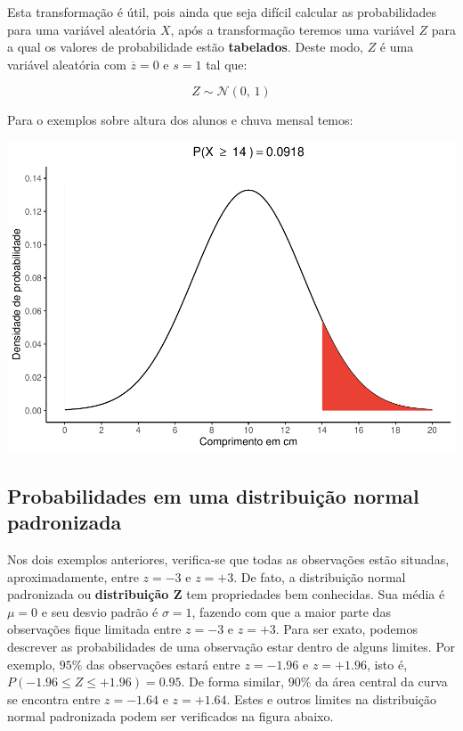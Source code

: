 \documentclass[
]{book}
\begin{document}
Esta transformação é útil, pois ainda que seja difícil calcular as probabilidades para uma variável aleatória \(X\), após a transformação teremos uma variável \(Z\) para a qual os valores de probabilidade estão \textbf{tabelados}. Deste modo, \(Z\) é uma variável aleatória com \(\overline{z} = 0\) e \(s = 1\) tal que:

\[Z \sim \mathcal{N}(0,\,1)\]

Para o exemplos sobre altura dos alunos e chuva mensal temos:

\begin{center}\includegraphics{probest-cambientais_files/figure-latex/unnamed-chunk-77-1} \end{center}

\hypertarget{probabilidades-em-uma-distribuiuxe7uxe3o-normal-padronizada}{%
\subsection{Probabilidades em uma distribuição normal padronizada}\label{probabilidades-em-uma-distribuiuxe7uxe3o-normal-padronizada}}

Nos dois exemplos anteriores, verifica-se que todas as observações estão situadas, aproximadamente, entre \(z = -3\) e \(z = +3\). De fato, a distribuição normal padronizada ou \textbf{distribuição Z} tem propriedades bem conhecidas. Sua média é \(\mu = 0\) e seu desvio padrão é \(\sigma = 1\), fazendo com que a maior parte das observações fique limitada entre \(z = -3\) e \(z = +3\). Para ser exato, podemos descrever as probabilidades de uma observação estar dentro de alguns limites. Por exemplo, \(95\%\) das observações estará entre \(z = -1.96\) e \(z = +1.96\), isto é, \(P(-1.96 \le Z \le +1.96) = 0.95\). De forma similar, \(90\%\) da área central da curva se encontra entre \(z = -1.64\) e \(z = +1.64\). Estes e outros limites na distribuição normal padronizada podem ser verificados na figura abaixo.
\end{document}
